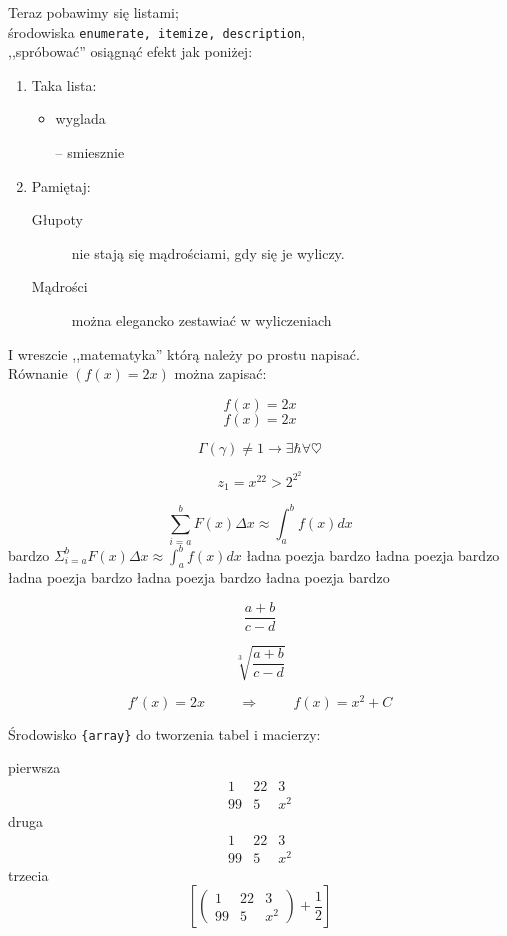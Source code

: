 \documentclass[11pt]{article}
\begin{document}
\newpage

\vspace*{-3cm}

Teraz pobawimy się listami;\\
środowiska \texttt{enumerate, itemize, description},\\
,,spróbować'' osiągnąć efekt jak poniżej:
 
\begin{enumerate}
	\item Taka lista:
	\begin{itemize}
		\item wyglada
		\item[--] smiesznie
	\end{itemize}
	\item Pamiętaj:
	\begin{description}
		\item[Głupoty] nie stają się mądrościami, gdy się je wyliczy.
		\item[Mądrości] można elegancko zestawiać w wyliczeniach
	\end{description}
\end{enumerate}

I wreszcie ,,matematyka'' którą należy po prostu napisać.\\
Równanie $(f(x) = 2x)$ można zapisać:

$$f(x) = 2x$$
\begin{equation}
f(x) = 2x
\end{equation}

$$\Gamma(\gamma) \neq 1 \rightarrow \exists \hbar \forall \heartsuit$$

$$z_1 = x^{22} > 2^{2^{2}}$$

$$\sum^b_{i=a} F(x) \Delta x \approx \int_a^b f(x) dx$$
bardzo $\Sigma^b_{i=a} F(x) \Delta x \approx \int_a^b f(x) dx$ ładna poezja bardzo ładna poezja bardzo ładna poezja bardzo ładna poezja bardzo ładna poezja bardzo

$$\frac{a+b}{c-d}$$

$$\sqrt[3]{\frac{a+b}{c-d}}$$

$$f'(x) = 2x \hspace{1cm} \Rightarrow \hspace{1cm} f(x) = x^2 + C$$

Środowisko \texttt{\{array\}} do tworzenia tabel i macierzy:

pierwsza
$$
\begin{array}{ccc}
1 & 22 & 3 \\
99 & 5 & x^2
\end{array}
$$
druga
$$
\begin{array}{ccc}
\hline
1 & 22 & 3 \\
\hline
99 & 5 & x^2
\end{array}
$$
trzecia
$$
\left[\left(
\begin{array}{ccc}
1 & 22 & 3 \\
99 & 5 & x^2
\end{array}
\right) + \frac{1}{2}\right]
$$
\end{document}
